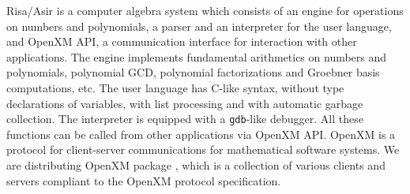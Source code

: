 \documentclass[runningheads]{cl2emult}
\begin{document}
Risa/Asir is a computer algebra system which consists of an engine for
operations on numbers and polynomials, a parser and an interpreter for
the user language, and OpenXM API, a communication interface for
interaction with other applications.
The engine implements fundamental arithmetics on numbers and polynomials,
polynomial GCD, polynomial factorizations and Groebner basis computations,
etc.
The user language has C-like syntax, without type declarations
of variables, with list processing and with automatic garbage collection.
The interpreter is equipped with a {\tt gdb}-like debugger.
All these functions can be called from other applications via OpenXM API.
OpenXM \cite{noro:RFC100} is a protocol for client-server
communications for mathematical software systems.  We are distributing
OpenXM package \cite{noro:OPENXM}, which is a collection of various
clients and servers compliant to the OpenXM protocol specification.
\end{document}
